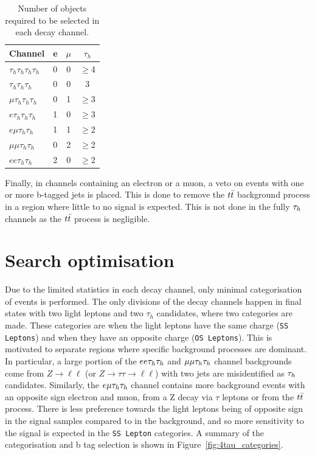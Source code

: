 \begin{table}[t]
   \centering
   \begin{tabular}{|l|c|c|c|}
   \hline
   \multicolumn{1}{|c|}{Channel} & e & $\mu$ & $\tau_h$ \\ \hline \hline
   $\tau_h \tau_h \tau_h \tau_h$ & 0 & 0     & $\geq$4        \\
   $\tau_h \tau_h \tau_h$        & 0 & 0     & 3        \\ 
   $\mu \tau_h \tau_h \tau_h$    & 0 & 1     & $\geq$3        \\
   $e \tau_h \tau_h \tau_h$      & 1 & 0     & $\geq$3        \\
   $e \mu \tau_h \tau_h$         & 1 & 1     & $\geq$2        \\
   $\mu \mu \tau_h \tau_h$       & 0 & 2     & $\geq$2        \\
   $e e \tau_h \tau_h$           & 2 & 0     & $\geq$2        \\ \hline
   \end{tabular}
   \caption[Number of objects required to be selected in each decay channel.]{Number of objects required to be selected in each decay channel.}
   \label{tab:leptonvetoes}
\end{table}

Finally, in channels containing an electron or a muon, a veto on events with one or more b-tagged jets is placed.
This is done to remove the $t\bar{t}$ background process in a region where little to no signal is expected.
This is not done in the fully $\tau_{h}$ channels as the $t\bar{t}$ process is negligible. \\

\section{Search optimisation}

Due to the limited statistics in each decay channel, only minimal categorisation of events is performed. 
The only divisions of the decay channels happen in final states with two light leptons and two $\tau_h$ candidates, where two categories are made.
These categories are when the light leptons have the same charge (\texttt{SS Leptons}) and when they have an opposite charge (\texttt{OS Leptons}).
This is motivated to separate regions where specific background processes are dominant.
In particular, a large portion of the $ee\tau_{h}\tau_{h}$ and $\mu\mu\tau_{h}\tau_{h}$ channel backgrounds come from $Z\rightarrow \ell\ell$ (or $Z\rightarrow\tau\tau\rightarrow \ell\ell$) with two jets are misidentified as $\tau_{h}$ candidates.
Similarly, the $e\mu\tau_{h}\tau_{h}$ channel contains more background events with an opposite sign electron and muon, from a Z decay via $\tau$ leptons or from the $t\bar{t}$ process.
There is less preference towards the light leptons being of opposite sign in the signal samples compared to in the background, and so more sensitivity to the signal is expected in the \texttt{SS Lepton} categories. 
A summary of the categorisation and b tag selection is shown in Figure~\ref{fig:4tau_categories}. \\

